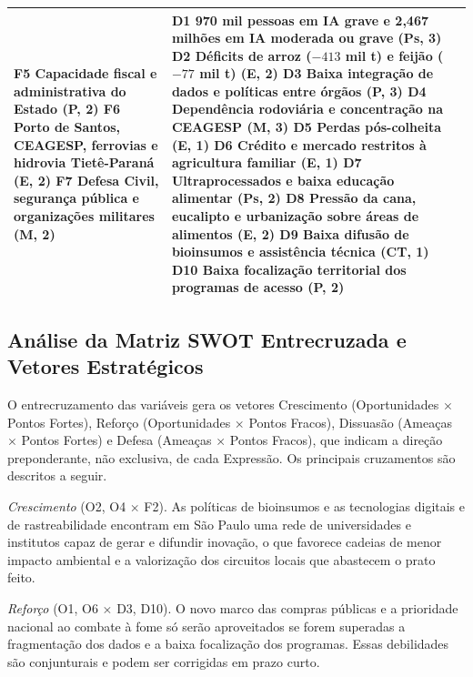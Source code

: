 \documentclass[
	12pt,				%
	openright,			%
	oneside,			%
	a4paper,			%
	chapter=TITLE,		%
	section=TITLE,		%
	english,			%
	french,				%
	spanish,			%
	brazil,				%
 ]{abntex2}
\begin{document}
\begin{quadro}[!htbp]
\begin{tabularx}{\textwidth}{|>{\raggedright\arraybackslash}X|>{\raggedright\arraybackslash}X|}
F5 Capacidade fiscal e administrativa do Estado (P, 2) \newline
F6 Porto de Santos, CEAGESP, ferrovias e hidrovia Tietê-Paraná (E, 2) \newline
F7 Defesa Civil, segurança pública e organizações militares (M, 2)
&
D1 970 mil pessoas em IA grave e 2,467 milhões em IA moderada ou grave (Ps, 3) \newline
D2 Déficits de arroz ($-413$ mil t) e feijão ($-77$ mil t) (E, 2) \newline
D3 Baixa integração de dados e políticas entre órgãos (P, 3) \newline
D4 Dependência rodoviária e concentração na CEAGESP (M, 3) \newline
D5 Perdas pós-colheita (E, 1) \quad D6 Crédito e mercado restritos à agricultura familiar (E, 1) \newline
D7 Ultraprocessados e baixa educação alimentar (Ps, 2) \newline
D8 Pressão da cana, eucalipto e urbanização sobre áreas de alimentos (E, 2) \newline
D9 Baixa difusão de bioinsumos e assistência técnica (CT, 1) \newline
D10 Baixa focalização territorial dos programas de acesso (P, 2) \\
\hline
\end{tabularx}
\end{quadro}

\subsection{Análise da Matriz SWOT Entrecruzada e Vetores Estratégicos}
O entrecruzamento das variáveis gera os vetores Crescimento (Oportunidades
$\times$ Pontos Fortes), Reforço (Oportunidades $\times$ Pontos Fracos),
Dissuasão (Ameaças $\times$ Pontos Fortes) e Defesa (Ameaças $\times$ Pontos
Fracos), que indicam a direção preponderante, não exclusiva, de cada Expressão. Os principais cruzamentos são descritos a
seguir.

\emph{Crescimento} (O2, O4 $\times$ F2). As políticas de bioinsumos e as
tecnologias digitais e de rastreabilidade encontram em São Paulo uma rede de
universidades e institutos capaz de gerar e difundir inovação, o que favorece
cadeias de menor impacto ambiental e a valorização dos circuitos locais que
abastecem o prato feito.

\emph{Reforço} (O1, O6 $\times$ D3, D10). O novo marco das compras públicas e a
prioridade nacional ao combate à fome só serão aproveitados se forem superadas a
fragmentação dos dados e a baixa focalização dos programas. Essas debilidades
são conjunturais e podem ser corrigidas em prazo curto.
\end{document}
